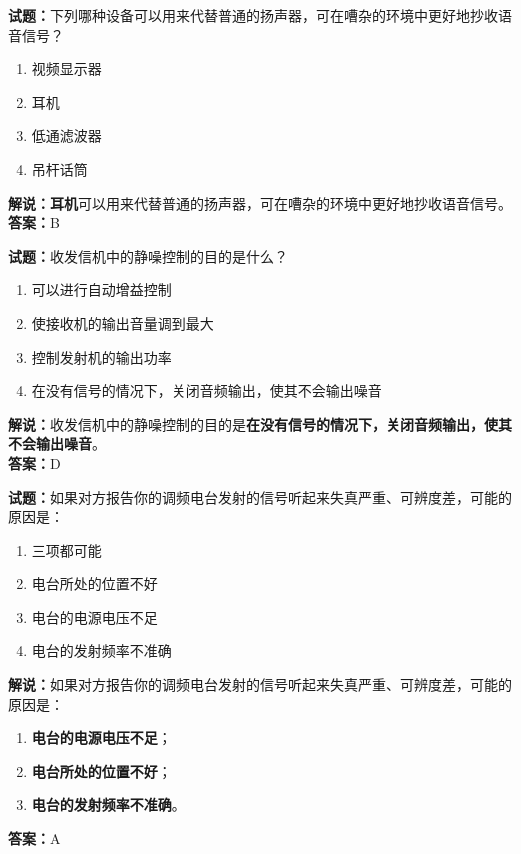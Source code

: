 \documentclass{ctexbook}
\begin{document}
\bigskip


\noindent\textbf{试题：}下列哪种设备可以用来代替普通的扬声器，可在嘈杂的环境中更好地抄收语音信号？
\begin{enumerate}[leftmargin=3em]
\item 视频显示器
\item 耳机
\item 低通滤波器
\item 吊杆话筒
\end{enumerate}
\noindent\textbf{解说：耳机}可以用来代替普通的扬声器，可在嘈杂的环境中更好地抄收语音信号。\\\noindent\textbf{答案：}B



\bigskip


\noindent\textbf{试题：}收发信机中的静噪控制的目的是什么？
\begin{enumerate}[leftmargin=3em]
\item 可以进行自动增益控制
\item 使接收机的输出音量调到最大
\item 控制发射机的输出功率
\item 在没有信号的情况下，关闭音频输出，使其不会输出噪音%
\end{enumerate}
\noindent\textbf{解说：}收发信机中的静噪控制的目的是\textbf{在没有信号的情况下，关闭音频输出，使其不会输出噪音}。\\\noindent\textbf{答案：}D




\bigskip


\noindent\textbf{试题：}如果对方报告你的调频电台发射的信号听起来失真严重、可辨度差，可能的原因是：
\begin{enumerate}[leftmargin=3em]
\item 三项都可能
\item 电台所处的位置不好
\item 电台的电源电压不足
\item 电台的发射频率不准确
\end{enumerate}
\noindent\textbf{解说：}如果对方报告你的调频电台发射的信号听起来失真严重、可辨度差，可能的原因是：
\begin{enumerate}[label=, leftmargin=3em]
\item \textbf{电台的电源电压不足}；
\item \textbf{电台所处的位置不好}；
\item \textbf{电台的发射频率不准确}。
\end{enumerate}
\noindent\textbf{答案：}A
\end{document}
